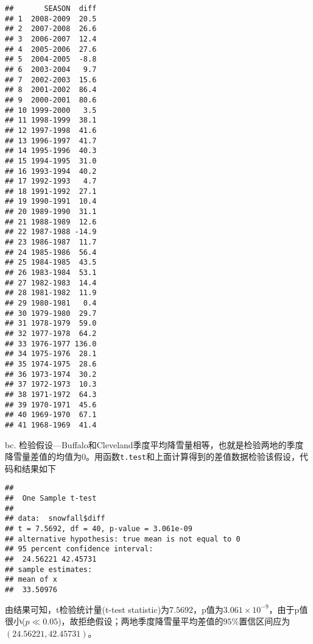 \documentclass[]{article}
\newenvironment{Shaded}{\begin{snugshade}}{\end{snugshade}}
\newcommand{\DataTypeTok}[1]{\textcolor[rgb]{0.13,0.29,0.53}{#1}}
\newcommand{\DecValTok}[1]{\textcolor[rgb]{0.00,0.00,0.81}{#1}}
\newcommand{\FloatTok}[1]{\textcolor[rgb]{0.00,0.00,0.81}{#1}}
\newcommand{\KeywordTok}[1]{\textcolor[rgb]{0.13,0.29,0.53}{\textbf{#1}}}
\newcommand{\NormalTok}[1]{#1}
\newcommand{\OperatorTok}[1]{\textcolor[rgb]{0.81,0.36,0.00}{\textbf{#1}}}
\begin{document}
\begin{verbatim}
##       SEASON  diff
## 1  2008-2009  20.5
## 2  2007-2008  26.6
## 3  2006-2007  12.4
## 4  2005-2006  27.6
## 5  2004-2005  -8.8
## 6  2003-2004   9.7
## 7  2002-2003  15.6
## 8  2001-2002  86.4
## 9  2000-2001  80.6
## 10 1999-2000   3.5
## 11 1998-1999  38.1
## 12 1997-1998  41.6
## 13 1996-1997  41.7
## 14 1995-1996  40.3
## 15 1994-1995  31.0
## 16 1993-1994  40.2
## 17 1992-1993   4.7
## 18 1991-1992  27.1
## 19 1990-1991  10.4
## 20 1989-1990  31.1
## 21 1988-1989  12.6
## 22 1987-1988 -14.9
## 23 1986-1987  11.7
## 24 1985-1986  56.4
## 25 1984-1985  43.5
## 26 1983-1984  53.1
## 27 1982-1983  14.4
## 28 1981-1982  11.9
## 29 1980-1981   0.4
## 30 1979-1980  29.7
## 31 1978-1979  59.0
## 32 1977-1978  64.2
## 33 1976-1977 136.0
## 34 1975-1976  28.1
## 35 1974-1975  28.6
## 36 1973-1974  30.2
## 37 1972-1973  10.3
## 38 1971-1972  64.3
## 39 1970-1971  45.6
## 40 1969-1970  67.1
## 41 1968-1969  41.4
\end{verbatim}

bc.
检验假设---Buffalo和Cleveland季度平均降雪量相等，也就是检验两地的季度降雪量差值的均值为\(0\)。用函数\texttt{t.test}和上面计算得到的差值数据检验该假设，代码和结果如下

\begin{Shaded}
\end{Shaded}

\begin{verbatim}
## 
##  One Sample t-test
## 
## data:  snowfall$diff
## t = 7.5692, df = 40, p-value = 3.061e-09
## alternative hypothesis: true mean is not equal to 0
## 95 percent confidence interval:
##  24.56221 42.45731
## sample estimates:
## mean of x 
##  33.50976
\end{verbatim}

由结果可知，t检验统计量(t-test
statistic)为\(7.5692\)，p值为\(3.061\times10^{-9}\)，由于p值很小(\(p\ll0.05\))，故拒绝假设；两地季度降雪量平均差值的\(95\%\)置信区间应为\((24.56221,42.45731)\)。
\end{document}
